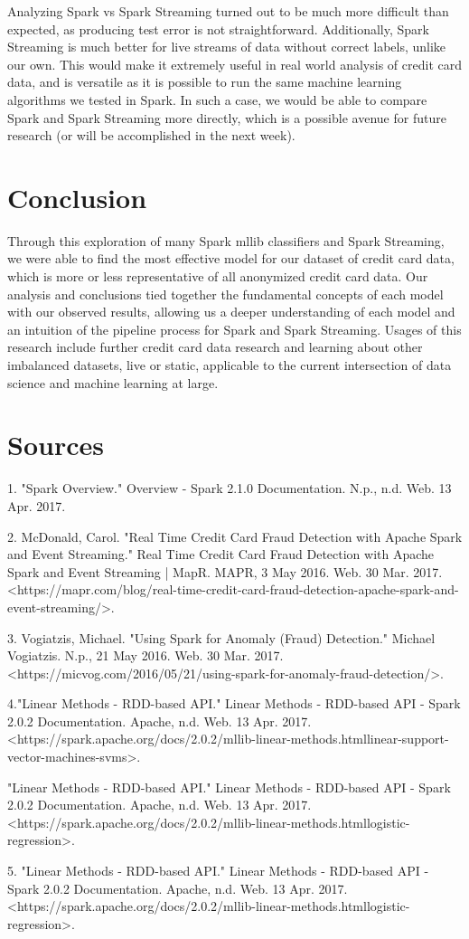 \documentclass[9pt,twocolumn,twoside]{idsi}
\begin{document}
Analyzing Spark vs Spark Streaming turned out to be much more difficult than expected, as producing test error is not straightforward. Additionally, Spark Streaming is much better for live streams of data without correct labels, unlike our own. This would make it extremely useful in real world analysis of credit card data, and is versatile as it is possible to run the same machine learning algorithms we tested in Spark. In such a case, we would be able to compare Spark and Spark Streaming more directly, which is a possible avenue for future research (or will be accomplished in the next week). 

\section{Conclusion}

Through this exploration of many Spark mllib classifiers and Spark Streaming, we were able to find the most effective model for our dataset of credit card data, which is more or less representative of all anonymized credit card data. Our analysis and conclusions tied together the fundamental concepts of each model with our observed results, allowing us a deeper understanding of each model and an intuition of the pipeline process for Spark and Spark Streaming. Usages of this research include further credit card data research and learning about other imbalanced datasets, live or static, applicable to the current intersection of data science and machine learning at large. 

\section{Sources}

1. "Spark Overview." Overview - Spark 2.1.0 Documentation. N.p., n.d. Web. 13 Apr. 2017.

2. McDonald, Carol. "Real Time Credit Card Fraud Detection with Apache Spark and Event Streaming." Real Time Credit Card Fraud Detection with Apache Spark and Event Streaming | MapR. MAPR, 3 May 2016. Web. 30 Mar. 2017. <https://mapr.com/blog/real-time-credit-card-fraud-detection-apache-spark-and-event-streaming/>.

3. Vogiatzis, Michael. "Using Spark for Anomaly (Fraud) Detection." Michael Vogiatzis. N.p., 21 May 2016. Web. 30 Mar. 2017. <https://micvog.com/2016/05/21/using-spark-for-anomaly-fraud-detection/>.

4."Linear Methods - RDD-based API." Linear Methods - RDD-based API - Spark 2.0.2 Documentation. Apache, n.d. Web. 13 Apr. 2017. <https://spark.apache.org/docs/2.0.2/mllib-linear-methods.htmllinear-support-vector-machines-svms>.

"Linear Methods - RDD-based API." Linear Methods - RDD-based API - Spark 2.0.2 Documentation. Apache, n.d. Web. 13 Apr. 2017. <https://spark.apache.org/docs/2.0.2/mllib-linear-methods.htmllogistic-regression>.


5. "Linear Methods - RDD-based API." Linear Methods - RDD-based API - Spark 2.0.2 Documentation. Apache, n.d. Web. 13 Apr. 2017. <https://spark.apache.org/docs/2.0.2/mllib-linear-methods.htmllogistic-regression>.
\end{document}
